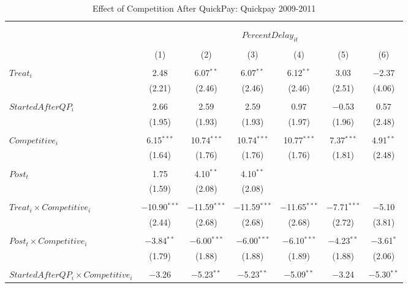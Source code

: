 \documentclass[
]{article}
\begin{document}
\begin{table}[H] \centering 
  \caption{Effect of Competition After QuickPay: Quickpay 2009-2011} 
  \label{} 
\small 
\begin{tabular}{@{\extracolsep{-3pt}}lcccccc} 
\\[-1.8ex]\hline 
\hline \\[-1.8ex] 
\\[-1.8ex] & \multicolumn{6}{c}{$PercentDelay_{it}$  } \\ 
\\[-1.8ex] & (1) & (2) & (3) & (4) & (5) & (6)\\ 
\hline \\[-1.8ex] 
 $Treat_i$ & 2.48 & 6.07$^{**}$ & 6.07$^{**}$ & 6.12$^{**}$ & 3.03 & $-$2.37 \\ 
  & (2.21) & (2.46) & (2.46) & (2.46) & (2.51) & (4.06) \\ 
  & & & & & & \\ 
 $StartedAfterQP_i$ & 2.66 & 2.59 & 2.59 & 0.97 & $-$0.53 & 0.57 \\ 
  & (1.95) & (1.93) & (1.93) & (1.97) & (1.96) & (2.48) \\ 
  & & & & & & \\ 
 $Competitive_i$ & 6.15$^{***}$ & 10.74$^{***}$ & 10.74$^{***}$ & 10.77$^{***}$ & 7.37$^{***}$ & 4.91$^{**}$ \\ 
  & (1.64) & (1.76) & (1.76) & (1.76) & (1.81) & (2.48) \\ 
  & & & & & & \\ 
 $Post_t$ & 1.75 & 4.10$^{**}$ & 4.10$^{**}$ &  &  &  \\ 
  & (1.59) & (2.08) & (2.08) &  &  &  \\ 
  & & & & & & \\ 
 $Treat_i \times Competitive_i$ & $-$10.90$^{***}$ & $-$11.59$^{***}$ & $-$11.59$^{***}$ & $-$11.65$^{***}$ & $-$7.71$^{***}$ & $-$5.10 \\ 
  & (2.44) & (2.68) & (2.68) & (2.68) & (2.72) & (3.81) \\ 
  & & & & & & \\ 
 $Post_t \times Competitive_i$ & $-$3.84$^{**}$ & $-$6.00$^{***}$ & $-$6.00$^{***}$ & $-$6.10$^{***}$ & $-$4.23$^{**}$ & $-$3.61$^{*}$ \\ 
  & (1.79) & (1.88) & (1.88) & (1.89) & (1.88) & (2.06) \\ 
  & & & & & & \\ 
 $StartedAfterQP_i \times Competitive_i$ & $-$3.26 & $-$5.23$^{**}$ & $-$5.23$^{**}$ & $-$5.09$^{**}$ & $-$3.24 & $-$5.30$^{**}$ \\ 

\end{tabular}
\end{table}
\end{document}
